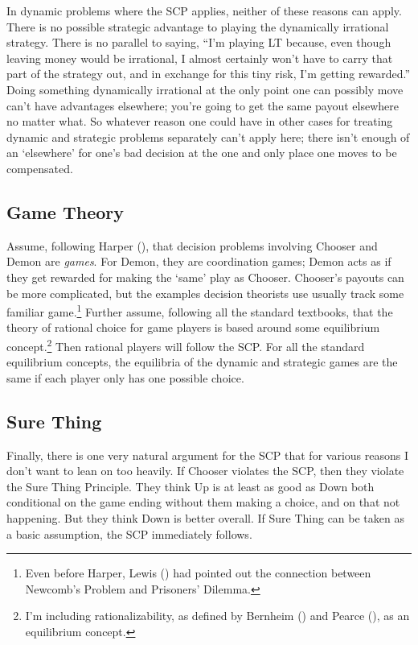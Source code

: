 \documentclass[
  11pt,
  letterpaper,
  DIV=11,
  numbers=noendperiod,
  twoside]{scrartcl}
\begin{document}
In dynamic problems where the SCP applies, neither of these reasons can
apply. There is no possible strategic advantage to playing the
dynamically irrational strategy. There is no parallel to saying, ``I'm
playing LT because, even though leaving money would be irrational, I
almost certainly won't have to carry that part of the strategy out, and
in exchange for this tiny risk, I'm getting rewarded.'' Doing something
dynamically irrational at the only point one can possibly move can't
have advantages elsewhere; you're going to get the same payout elsewhere
no matter what. So whatever reason one could have in other cases for
treating dynamic and strategic problems separately can't apply here;
there isn't enough of an `elsewhere' for one's bad decision at the one
and only place one moves to be compensated.

\subsection{Game Theory}\label{sec-game-theory}

Assume, following Harper (), that
decision problems involving Chooser and Demon are \emph{games}. For
Demon, they are coordination games; Demon acts as if they get rewarded
for making the `same' play as Chooser. Chooser's payouts can be more
complicated, but the examples decision theorists use usually track some
familiar game.\footnote{Even before Harper, Lewis
  () had pointed out the connection
  between Newcomb's Problem and Prisoners' Dilemma.} Further assume,
following all the standard textbooks, that the theory of rational choice
for game players is based around some equilibrium concept.\footnote{I'm
  including rationalizability, as defined by Bernheim
  () and Pearce
  (), as an equilibrium concept.} Then
rational players will follow the SCP. For all the standard equilibrium
concepts, the equilibria of the dynamic and strategic games are the same
if each player only has one possible choice.

\subsection{Sure Thing}\label{sec-surething}

Finally, there is one very natural argument for the SCP that for various
reasons I don't want to lean on too heavily. If Chooser violates the
SCP, then they violate the Sure Thing Principle. They think Up is at
least as good as Down both conditional on the game ending without them
making a choice, and on that not happening. But they think Down is
better overall. If Sure Thing can be taken as a basic assumption, the
SCP immediately follows.
\end{document}
